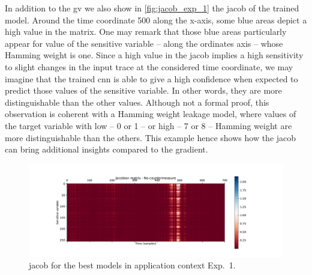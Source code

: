 In addition to the \gls{gv} we also show in \autoref{fig:jacob_exp_1} the \gls{jacob} of the trained model.
Around the time coordinate 500 along the x-axis, some blue areas depict a high value in the matrix.
One may remark that those blue areas particularly appear for value of the sensitive variable -- along the  ordinates axis -- whose Hamming weight is one.
Since a high value in the \gls{jacob} implies a high sensitivity to slight changes in the input trace at the considered time coordinate, we may imagine that the trained \gls{cnn} is able to give a high confidence when expected to predict those values of the sensitive variable.
In other words, they are more distinguishable than the other values.
Although not a formal proof, this observation is coherent with a Hamming weight leakage model, where values of the target variable with low -- \eg{} 0 or 1 -- or high -- \eg{} 7 or 8 -- Hamming weight are more distinguishable than the others.
This example hence shows how the \gls{jacob} can bring additional insights compared to the gradient.

\begin{figure}[h]
    \centering
    \includegraphics[width=\textwidth]{figures/ASCAD_700/no_mask_no_desynchro/jacob_n_dense_0_CV_0}
    \caption{\gls{jacob} for the best models in application context Exp.~1.}
    \label{fig:jacob_exp_1}
\end{figure}


